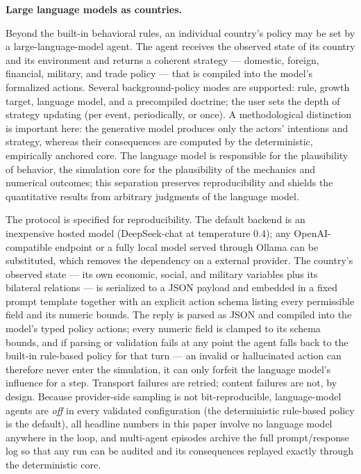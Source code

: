 \documentclass[a4paper,fleqn]{cas-sc}
\newcommand{\response}[1]{\medskip\noindent\textcolor{blue}{\small\itshape [Addressed: #1]}\medskip}
\begin{document}
\textbf{Large language models as countries.}


Beyond the built-in behavioral rules, an individual
country's policy may be set by a large-language-model agent. The agent receives the observed state of
its country and its environment and returns a coherent strategy --- domestic, foreign, financial,
military, and trade policy --- that is compiled into the model's formalized actions. Several
background-policy modes are supported: rule, growth target, language model, and a precompiled
doctrine; the user sets the depth of strategy updating (per event, periodically, or once). A
methodological distinction is important here: the generative model produces only the actors'
intentions and strategy, whereas their consequences are computed by the deterministic, empirically
anchored core. The language model is responsible for the plausibility of behavior, the simulation
core for the plausibility of the mechanics and numerical outcomes; this separation preserves
reproducibility and shields the quantitative results from arbitrary judgments of the language model.

The protocol is specified for reproducibility. The default backend is an inexpensive hosted model
(DeepSeek-chat at temperature $0.4$); any OpenAI-compatible endpoint or a fully local model served
through Ollama can be substituted, which removes the dependency on a external provider. The
country's observed state --- its own economic, social, and military variables plus its bilateral
relations --- is serialized to a JSON payload and embedded in a fixed prompt template together
with an explicit action schema listing every permissible field and its numeric bounds. The reply
is parsed as JSON and compiled into the model's typed policy actions; every numeric field is
clamped to its schema bounds, and if parsing or validation fails at any point the agent falls back
to the built-in rule-based policy for that turn --- an invalid or hallucinated action can
therefore never enter the simulation, it can only forfeit the language model's influence for a
step. Transport failures are retried; content failures are not, by design. Because provider-side
sampling is not bit-reproducible, language-model agents are \emph{off} in every validated
configuration (the deterministic rule-based policy is the default), all headline numbers in this
paper involve no language model anywhere in the loop, and multi-agent episodes archive the full
prompt/response log so that any run can be audited and its consequences replayed exactly through
the deterministic core.
\end{document}
